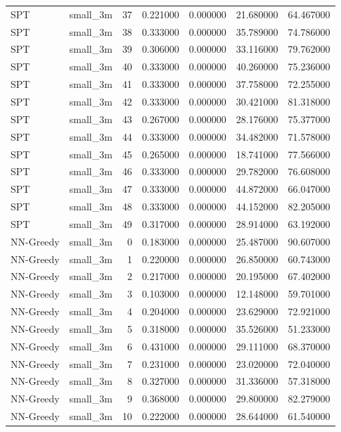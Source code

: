 \begin{tabular}{llrrrrr}
SPT & small_3m & 37 & 0.221000 & 0.000000 & 21.680000 & 64.467000 \\
SPT & small_3m & 38 & 0.333000 & 0.000000 & 35.789000 & 74.786000 \\
SPT & small_3m & 39 & 0.306000 & 0.000000 & 33.116000 & 79.762000 \\
SPT & small_3m & 40 & 0.333000 & 0.000000 & 40.260000 & 75.236000 \\
SPT & small_3m & 41 & 0.333000 & 0.000000 & 37.758000 & 72.255000 \\
SPT & small_3m & 42 & 0.333000 & 0.000000 & 30.421000 & 81.318000 \\
SPT & small_3m & 43 & 0.267000 & 0.000000 & 28.176000 & 75.377000 \\
SPT & small_3m & 44 & 0.333000 & 0.000000 & 34.482000 & 71.578000 \\
SPT & small_3m & 45 & 0.265000 & 0.000000 & 18.741000 & 77.566000 \\
SPT & small_3m & 46 & 0.333000 & 0.000000 & 29.782000 & 76.608000 \\
SPT & small_3m & 47 & 0.333000 & 0.000000 & 44.872000 & 66.047000 \\
SPT & small_3m & 48 & 0.333000 & 0.000000 & 44.152000 & 82.205000 \\
SPT & small_3m & 49 & 0.317000 & 0.000000 & 28.914000 & 63.192000 \\
NN-Greedy & small_3m & 0 & 0.183000 & 0.000000 & 25.487000 & 90.607000 \\
NN-Greedy & small_3m & 1 & 0.220000 & 0.000000 & 26.850000 & 60.743000 \\
NN-Greedy & small_3m & 2 & 0.217000 & 0.000000 & 20.195000 & 67.402000 \\
NN-Greedy & small_3m & 3 & 0.103000 & 0.000000 & 12.148000 & 59.701000 \\
NN-Greedy & small_3m & 4 & 0.204000 & 0.000000 & 23.629000 & 72.921000 \\
NN-Greedy & small_3m & 5 & 0.318000 & 0.000000 & 35.526000 & 51.233000 \\
NN-Greedy & small_3m & 6 & 0.431000 & 0.000000 & 29.111000 & 68.370000 \\
NN-Greedy & small_3m & 7 & 0.231000 & 0.000000 & 23.020000 & 72.040000 \\
NN-Greedy & small_3m & 8 & 0.327000 & 0.000000 & 31.336000 & 57.318000 \\
NN-Greedy & small_3m & 9 & 0.368000 & 0.000000 & 29.800000 & 82.279000 \\
NN-Greedy & small_3m & 10 & 0.222000 & 0.000000 & 28.644000 & 61.540000 \\

\end{tabular}
